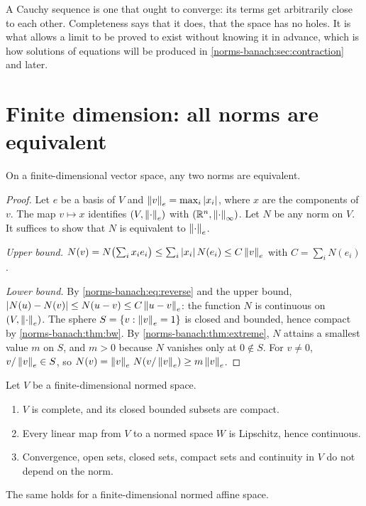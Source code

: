 \begin{notechapter}
\begin{intuition}
A Cauchy sequence is one that ought to converge: its terms get arbitrarily
close to each other. Completeness says that it does, that the space has no
holes. It is what allows a limit to be proved to exist without knowing it
in advance, which is how solutions of equations will be produced in
\cref{norms-banach:sec:contraction} and later.
\end{intuition}

\section{Finite dimension: all norms are equivalent}
\label{norms-banach:sec:finite}

\begin{theorem}\label{norms-banach:thm:equivalence}
On a finite-dimensional vector space, any two norms are equivalent.
\end{theorem}

\begin{proof}
Let $e$ be a basis of $V$ and $\left\|v\right\|_e = \max_i\left|x_i\right|$, where $x$ are
the components of $v$. The map $v\mapsto x$ identifies $(V, \left\|\cdot\right\|_e)$
with $(\mathbb{R}^n, \left\|\cdot\right\|_\infty)$. Let $N$ be any norm on $V$. It suffices
to show that $N$ is equivalent to $\left\|\cdot\right\|_e$.

\emph{Upper bound.} $N(v) = N\bigl(\sum_ix_ie_i\bigr)
\leq\sum_i\left|x_i\right|N(e_i)\leq C\left\|v\right\|_e$ with $C = \sum_iN(e_i)$.

\emph{Lower bound.} By \eqref{norms-banach:eq:reverse} and the upper
bound, $\left|N(u) - N(v)\right|\leq N(u - v)\leq C\left\|u - v\right\|_e$: the function
$N$ is continuous on $(V, \left\|\cdot\right\|_e)$. The sphere
$S = \{v : \left\|v\right\|_e = 1\}$ is closed and bounded, hence compact by
\cref{norms-banach:thm:bw}. By \cref{norms-banach:thm:extreme}, $N$ attains
a smallest value $m$ on $S$, and $m > 0$ because $N$ vanishes only at
$0\notin S$. For $v\neq0$, $v/\left\|v\right\|_e\in S$, so
$N(v) = \left\|v\right\|_e\,N(v/\left\|v\right\|_e)\geq m\left\|v\right\|_e$.
\end{proof}

\begin{corollary}\label{norms-banach:cor:finite}
Let $V$ be a finite-dimensional normed space.
\begin{enumerate}[nosep]
  \item $V$ is complete, and its closed bounded subsets are compact.
  \item Every linear map from $V$ to a normed space $W$ is Lipschitz, hence
        continuous.
  \item Convergence, open sets, closed sets, compact sets and continuity
        in $V$ do not depend on the norm.
\end{enumerate}
The same holds for a finite-dimensional normed affine space.
\end{corollary}


\end{notechapter}
